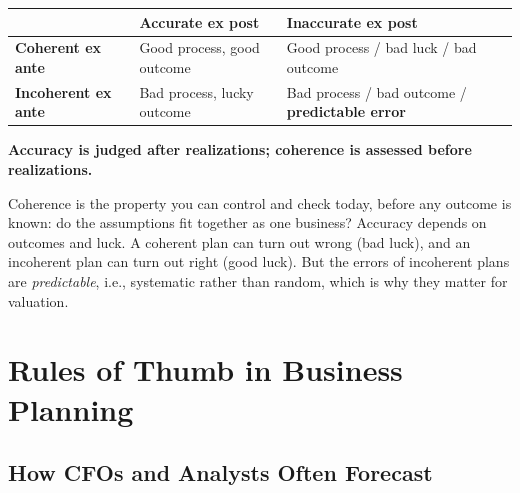 \begin{center}
\small
\begin{tabularx}{\textwidth}{@{}lXX@{}}
\toprule
 & \textbf{Accurate ex post} & \textbf{Inaccurate ex post}\\
\midrule
\textbf{Coherent ex ante} & Good process, good outcome & Good process / bad luck / bad outcome\\
\textbf{Incoherent ex ante} & Bad process, lucky outcome & Bad process / bad outcome / \textbf{predictable error}\\
\bottomrule
\end{tabularx}
\end{center}
\begin{keybox}
\textbf{Accuracy is judged after realizations; coherence is assessed before realizations.}
\end{keybox}
\begin{addbox}
Coherence is the property you can control and check today, before any outcome is known: do the assumptions fit together as one business? Accuracy depends on outcomes and luck. A coherent plan can turn out wrong (bad luck), and an incoherent plan can turn out right (good luck). But the errors of incoherent plans are \emph{predictable}, i.e., systematic rather than random, which is why they matter for valuation.
\end{addbox}

\section{Rules of Thumb in Business Planning}

\subsection{How CFOs and Analysts Often Forecast}

